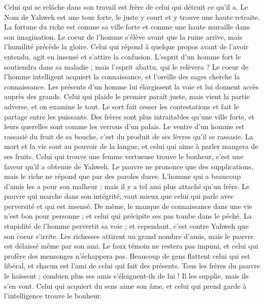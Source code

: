 \begin{multicols}{2}
Celui qui se relâche dans son travail est frère de celui qui détruit ce qu'il a.
Le Nom de Yahweh est une tour forte, le juste y court et y trouve une haute retraite.
La fortune du riche est comme sa ville forte et comme une haute muraille dans son imagination.
Le coeur de l'homme s'élève avant que la ruine arrive, mais l'humilité précède la gloire.
Celui qui répond à quelque propos avant de l'avoir entendu, agit en insensé et s’attire la confusion.
L'esprit d'un homme fort le soutiendra dans sa maladie ; mais l'esprit abattu, qui le relèvera ?
Le coeur de l'homme intelligent acquiert la connaissance, et l'oreille des sages cherche la connaissance.
Les présents d'un homme lui élargissent la voie et lui donnent accès auprès des grands.
Celui qui plaide le premier paraît juste, mais vient la partie adverse, et on examine le tout.
Le sort fait cesser les contestations et fait le partage entre les puissants.
Des frères sont plus intraitables qu’une ville forte, et leurs querelles sont comme les verrous d'un palais.
Le ventre d’un homme est rassasié du fruit de sa bouche, c’est du produit de ses lèvres qu’il se rassasie.
La mort et la vie sont au pouvoir de la langue, et celui qui aime à parler mangera de ses fruits.
Celui qui trouve une femme vertueuse trouve le bonheur, c’est une faveur qu’il a obtenue de Yahweh.
Le pauvre ne prononce que des supplications, mais le riche ne répond que par des paroles dures.
L’homme qui a beaucoup d’amis les a pour son malheur ; mais il y a tel ami plus attaché qu'un frère.
\VerseOne{}Le pauvre qui marche dans son intégrité, vaut mieux que celui qui parle avec perversité et qui est insensé.
De même, le manque de connaissance dans une vie n'est bon pour personne ; et celui qui précipite ses pas tombe dans le péché.
La stupidité de l'homme pervertit sa voie ; et cependant, c’est contre Yahweh que son coeur s’irrite.
Les richesses attirent un grand nombre d'amis, mais le pauvre est délaissé même par son ami.
Le faux témoin ne restera pas impuni, et celui qui profère des mensonges n'échappera pas.
Beaucoup de gens flattent celui qui est libéral, et chacun est l’ami de celui qui fait des présents.
Tous les frères du pauvre le haïssent ; combien plus ses amis s’éloignent-ils de lui ! Il les supplie, mais ils s’en vont.
Celui qui acquiert du sens aime son âme, et celui qui prend garde à l'intelligence trouve le bonheur.

\end{multicols}
